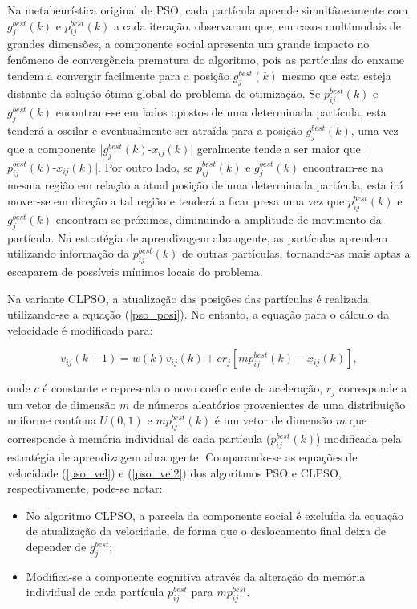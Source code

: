\documentclass[
	12pt,				%
	openany,			%
	twoside,			%
	a4paper,			%
	chapter=TITLE,		%
	section=Title,		%
	subsection=Title,	%
	subsubsection=Title,%
	english,			%
	french,				%
	spanish,			%
	brazil			%
	]{abntex2}
\begin{document}
\begin{ERRATA}
Na metaheurística original de PSO, cada partícula aprende simultâneamente com $g^{best}_{j}(k)$ e $p^{best}_{ij}(k)$ a cada iteração.  observaram que, em casos multimodais de grandes dimensões, a componente social apresenta um grande impacto no fenômeno de convergência prematura do algoritmo, pois as partículas do enxame tendem a convergir facilmente para a posição $g^{best}_{j}(k)$ mesmo que esta esteja distante da solução ótima global do problema de otimização. Se $p^{best}_{ij}(k)$ e $g^{best}_{j}(k)$ encontram-se em lados opostos de uma determinada partícula, esta tenderá a oscilar e eventualmente ser atraída para a posição $g^{best}_{j}(k)$, uma vez que a componente |$g^{best}_{j}(k)$-$x_{ij}(k)$| geralmente tende a ser maior que |$p^{best}_{ij}(k)$-$x_{ij}(k)$|. Por outro lado, se $p^{best}_{ij}(k)$ e $g^{best}_{j}(k)$ encontram-se na mesma região em relação a atual posição de uma determinada partícula, esta irá mover-se em direção a tal região e tenderá a ficar presa uma vez que $p^{best}_{ij}(k)$ e $g^{best}_{j}(k)$ encontram-se próximos, diminuindo a amplitude de movimento da partícula. Na estratégia de aprendizagem abrangente, as partículas aprendem utilizando informação da $p^{best}_{ij}(k)$ de outras partículas, tornando-as mais aptas a escaparem de possíveis mínimos locais do problema.

Na variante CLPSO, a atualização das posições das partículas é realizada utilizando-se a equação (\ref{pso_posi}). No entanto, a equação para o cálculo da velocidade é modificada para:

\begin{equation} \label{pso_vel2}
v_{ij}(k+1) = w(k) v_{ij}(k)+cr_{j}[mp^{best}_{ij}(k)-x_{ij}(k)],
\end{equation}

\noindent onde $c$ é constante e representa o novo coeficiente de aceleração, $r_{j}$ corresponde a um vetor de dimensão $m$ de números aleatórios provenientes de uma distribuição uniforme contínua $U(0,1)$ e $mp^{best}_{ij}(k)$ é um vetor de dimensão $m$ que corresponde à memória individual de cada partícula ($p^{best}_{ij}(k)$) modificada pela estratégia de aprendizagem abrangente. Comparando-se as equações de velocidade (\ref{pso_vel}) e (\ref{pso_vel2}) dos algoritmos PSO e CLPSO, respectivamente, pode-se notar:

\begin{itemize}
    \item No algoritmo CLPSO, a parcela da componente social é excluída da equação de atualização da velocidade, de forma que o deslocamento final deixa de depender de $g^{best}_{j}$;
    \item Modifica-se a componente cognitiva através da alteração da memória individual de cada partícula $p^{best}_{ij}$ para $mp^{best}_{ij}$. 
    

\end{itemize}
\end{ERRATA}
\end{document}
